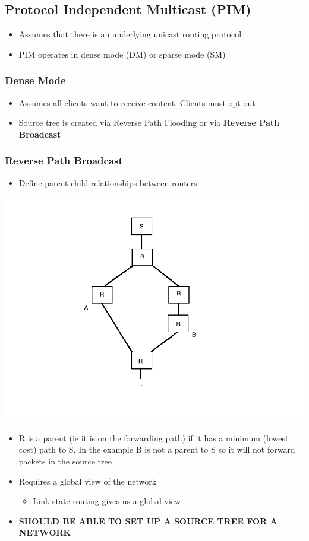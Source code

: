 \documentclass[11pt]{article}
\begin{document}
\subsection{Protocol Independent Multicast (PIM)}
\label{sec:orgheadline107}
\begin{itemize}
\item Assumes that there is an underlying unicast routing protocol
\item PIM operates in dense mode (DM) or sparse mode (SM)
\end{itemize}

\subsubsection{Dense Mode}
\label{sec:orgheadline104}
\begin{itemize}
\item Assumes all clients want to receive content. Clients must opt out
\item Source tree is created via Reverse Path Flooding or via \textbf{Reverse
Path Broadcast}
\end{itemize}

\subsubsection{Reverse Path Broadcast}
\label{sec:orgheadline105}
\begin{itemize}
\item Define parent-child relationships between routers
\end{itemize}
\includegraphics[width=.9\linewidth]{diagrams/rpb.png}
\begin{itemize}
\item R is a parent (ie it is on the forwarding path) if it has a minimum
(lowest cost) path to S. In the example B is not a parent to S so it
will not forward packets in the source tree
\item Requires a global view of the network 
\begin{itemize}
\item Link state routing gives us a global view
\end{itemize}
\item \textbf{SHOULD BE ABLE TO SET UP A SOURCE TREE FOR A NETWORK}
\end{itemize}
\end{document}
